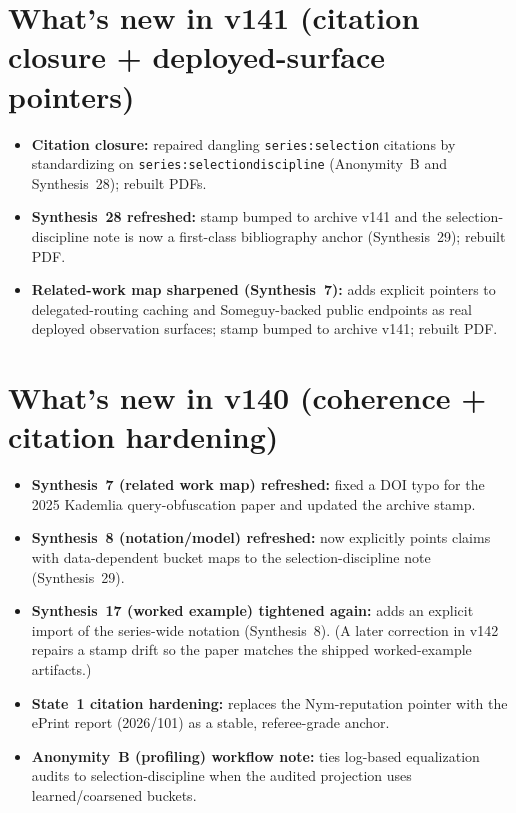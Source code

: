 \documentclass[11pt]{article}
\begin{document}
\section{What's new in v141 (citation closure + deployed-surface pointers)}
\begin{itemize}[leftmargin=*]
\item \textbf{Citation closure:} repaired dangling \texttt{series:selection} citations by standardizing on \texttt{series:selectiondiscipline} (Anonymity~B and Synthesis~28); rebuilt PDFs.
\item \textbf{Synthesis~28 refreshed:} stamp bumped to archive v141 and the selection-discipline note is now a first-class bibliography anchor (Synthesis~29); rebuilt PDF.
\item \textbf{Related-work map sharpened (Synthesis~7):} adds explicit pointers to delegated-routing caching and Someguy-backed public endpoints as real deployed observation surfaces; stamp bumped to archive v141; rebuilt PDF.
\end{itemize}

\section{What's new in v140 (coherence + citation hardening)}
\begin{itemize}[leftmargin=*]
\item \textbf{Synthesis~7 (related work map) refreshed:} fixed a DOI typo for the 2025 Kademlia query-obfuscation paper and updated the archive stamp.
\item \textbf{Synthesis~8 (notation/model) refreshed:} now explicitly points claims with data-dependent bucket maps to the selection-discipline note (Synthesis~29).
\item \textbf{Synthesis~17 (worked example) tightened again:} adds an explicit import of the series-wide notation (Synthesis~8). (A later correction in v142 repairs a stamp drift so the paper matches the shipped worked-example artifacts.)
\item \textbf{State~1 citation hardening:} replaces the Nym-reputation pointer with the ePrint report (2026/101) as a stable, referee-grade anchor.
\item \textbf{Anonymity~B (profiling) workflow note:} ties log-based equalization audits to selection-discipline when the audited projection uses learned/coarsened buckets.
\end{itemize}
\end{document}
